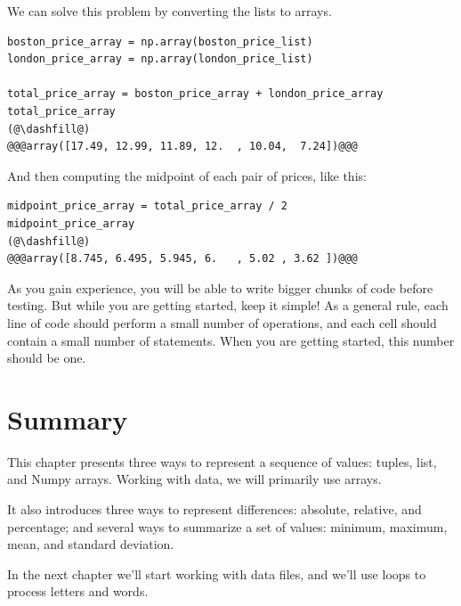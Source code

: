 We can solve this problem by converting the lists to arrays.

\begin{lstlisting}[]
boston_price_array = np.array(boston_price_list)
london_price_array = np.array(london_price_list)

total_price_array = boston_price_array + london_price_array
total_price_array
(@\dashfill@)
@@@array([17.49, 12.99, 11.89, 12.  , 10.04,  7.24])@@@
\end{lstlisting}

And then computing the midpoint of each pair of prices, like this:

\begin{lstlisting}[]
midpoint_price_array = total_price_array / 2
midpoint_price_array
(@\dashfill@)
@@@array([8.745, 6.495, 5.945, 6.   , 5.02 , 3.62 ])@@@
\end{lstlisting}

As you gain experience, you will be able to write bigger chunks of code
before testing. But while you are getting started, keep it simple! As a
general rule, each line of code should perform a small number of
operations, and each cell should contain a small number of statements.
When you are getting started, this number should be one.

\hypertarget{summary}{%
\section{Summary}\label{summary}}

This chapter presents three ways to represent a sequence of values:
tuples, list, and Numpy arrays. Working with data, we will primarily use
arrays.

It also introduces three ways to represent differences: absolute,
relative, and percentage; and several ways to summarize a set of values:
minimum, maximum, mean, and standard deviation.

In the next chapter we'll start working with data files, and we'll use
loops to process letters and words.

